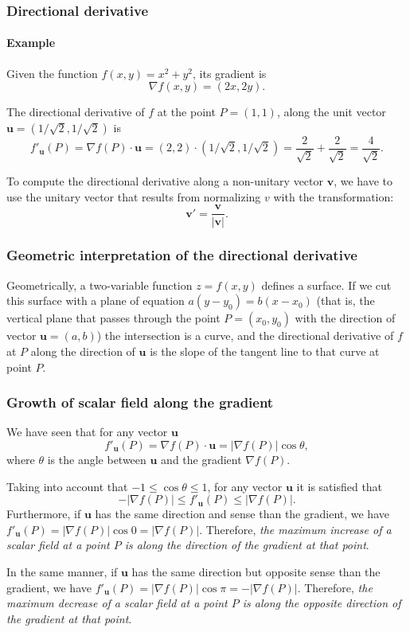\begin{frame}
\frametitle{Directional derivative}
\framesubtitle{Example}
Given the function $f(x,y) = x^2+y^2$, its gradient is
\[
\nabla f(x,y) = (2x,2y).
\]

The directional derivative of $f$ at the point $P=(1,1)$, along the unit vector $\mathbf{u}=(1/\sqrt{2},1/\sqrt{2})$ is
\[
f'_{\mathbf{u}}(P) = \nabla f(P)\cdot \mathbf{u} = (2,2)\cdot(1/\sqrt{2},1/\sqrt{2}) = \frac{2}{\sqrt{2}}+\frac{2}{\sqrt{2}} = \frac{4}{\sqrt{2}}.
\]

To compute the directional derivative along a non-unitary vector $\mathbf{v}$, we have to use the unitary vector that results from normalizing $v$ with the transformation:
\[
\mathbf{v'}=\frac{\mathbf{v}}{|\mathbf{v}|}.
\]
\end{frame}


\begin{frame}
\frametitle{Geometric interpretation of the directional derivative}
Geometrically, a two-variable function $z=f(x,y)$ defines a surface.
If we cut this surface with a plane of equation $a(y-y_0)=b(x-x_0)$ (that is, the vertical plane that passes through the point $P=(x_0,y_0)$ with the direction of vector $\mathbf{u}=(a,b)$)
the intersection is a curve, and the directional derivative of $f$ at $P$ along the direction of $\mathbf{u}$ is the slope of the tangent line to that curve at point $P$.

\begin{center}

\end{center}
\end{frame}


\begin{frame}
\frametitle{Growth of scalar field along the gradient}
We have seen that for any vector $\mathbf{u}$
\[
f'_{\mathbf{u}}(P) = \nabla f(P)\cdot \mathbf{u} = |\nabla f(P)|\cos \theta,
\]
where $\theta$ is the angle between $\mathbf{u}$ and the gradient $\nabla f(P)$.

Taking into account that $-1\leq \cos\theta\leq 1$, for any vector $\mathbf{u}$ it is satisfied that
\[
-|\nabla f(P)|\leq f'_{\mathbf{u}}(P)\leq |\nabla f(P)|.
\]
Furthermore, if $\mathbf{u}$ has the same direction and sense than the gradient, we have $f'_{\mathbf{u}}(P)=|\nabla f(P)|\cos 0=|\nabla f(P)|$.
Therefore, \alert{\emph{the maximum increase of a scalar field at a point $P$ is along the direction of the gradient at that point}}.

In the same manner, if $\mathbf{u}$ has the same direction but opposite sense than the gradient, we have $f'_{\mathbf{u}}(P)=|\nabla f(P)|\cos \pi=-|\nabla f(P)|$.
Therefore, \alert{\emph{the maximum decrease of a scalar field at a point $P$ is along the opposite direction of the gradient at that point}}.
\end{frame}


